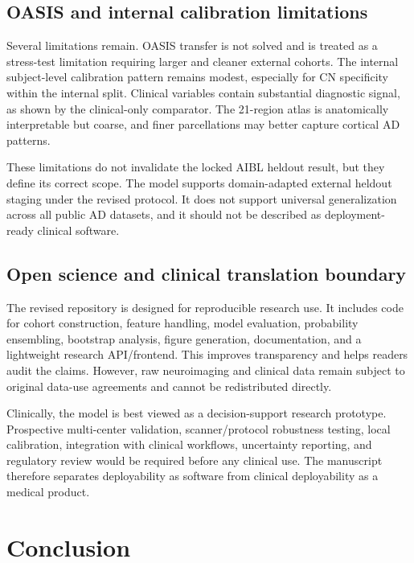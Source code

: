 \subsection{OASIS and internal calibration limitations}
\label{sec:discussion_limitations}

Several limitations remain. OASIS transfer is not solved and is treated as a stress-test limitation requiring larger and cleaner external cohorts. The internal subject-level calibration pattern remains modest, especially for CN specificity within the internal split. Clinical variables contain substantial diagnostic signal, as shown by the clinical-only comparator. The 21-region atlas is anatomically interpretable but coarse, and finer parcellations may better capture cortical AD patterns.

These limitations do not invalidate the locked AIBL heldout result, but they define its correct scope. The model supports domain-adapted external heldout staging under the revised protocol. It does not support universal generalization across all public AD datasets, and it should not be described as deployment-ready clinical software.

\subsection{Open science and clinical translation boundary}
\label{sec:discussion_deployment}

The revised repository is designed for reproducible research use. It includes code for cohort construction, feature handling, model evaluation, probability ensembling, bootstrap analysis, figure generation, documentation, and a lightweight research API/frontend. This improves transparency and helps readers audit the claims. However, raw neuroimaging and clinical data remain subject to original data-use agreements and cannot be redistributed directly.

Clinically, the model is best viewed as a decision-support research prototype. Prospective multi-center validation, scanner/protocol robustness testing, local calibration, integration with clinical workflows, uncertainty reporting, and regulatory review would be required before any clinical use. The manuscript therefore separates deployability as software from clinical deployability as a medical product.


\section{Conclusion}
\label{sec:conclusion}

